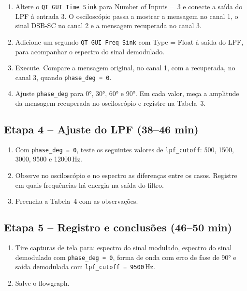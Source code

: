 \documentclass[11pt,a4paper]{article}
\begin{document}
\begin{instrucao}
\begin{enumerate}[label=\arabic*.]
\begin{itemize}
      \item Window = Hamming
    \end{itemize}
  \item Altere o \texttt{QT GUI Time Sink} para Number of Inputs = 3 e
    conecte a saída do LPF à entrada 3.  O osciloscópio passa a mostrar
    a mensagem no canal 1, o sinal DSB-SC no canal 2 e a mensagem
    recuperada no canal 3.
  \item Adicione um segundo \texttt{QT GUI Freq Sink} com Type = Float à
    saída do LPF, para acompanhar o espectro do sinal demodulado.
  \item Execute. Compare a mensagem original, no canal 1, com a recuperada,
    no canal 3, quando \texttt{phase\_deg = 0}.
  \item Ajuste \texttt{phase\_deg} para 0°, 30°, 60° e 90°.  Em cada valor,
    meça a amplitude da mensagem recuperada no osciloscópio e registre na
    Tabela~3.
\end{enumerate}
\end{instrucao}

\subsection*{Etapa 4 -- Ajuste do LPF (38--46 min)}

\begin{instrucao}
\begin{enumerate}[label=\arabic*.]
  \item Com \texttt{phase\_deg = 0}, teste os seguintes valores de
    \texttt{lpf\_cutoff}: 500, 1500, 3000, 9500 e 12000\,Hz.
  \item Observe no osciloscópio e no espectro as diferenças entre os casos.
    Registre em quais frequências há energia na saída do filtro.
  \item Preencha a Tabela~4 com as observações.
\end{enumerate}
\end{instrucao}

\subsection*{Etapa 5 -- Registro e conclusões (46--50 min)}

\begin{enumerate}[label=\arabic*.]
  \item Tire capturas de tela para: espectro do sinal modulado, espectro do
    sinal demodulado com \texttt{phase\_deg = 0}, forma de onda com erro
    de fase de 90° e saída demodulada com \texttt{lpf\_cutoff = 9500}\,Hz.
  \item Salve o flowgraph.
\end{enumerate}
\end{document}
